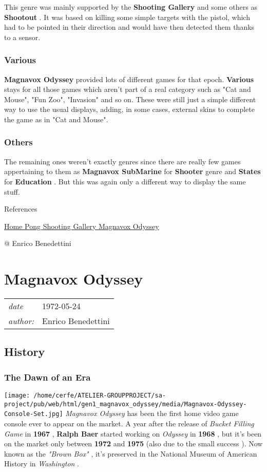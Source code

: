 \documentclass[a4paper,10pt]{book}
\newcommand{\pageHeader}[4]{
    \section{#1}
    \vspace{-0.3cm}
    \begin{table}[h!]
     \begin{tabular}{ll}
        \hline
        \textit{date} & #2 \\
        \textit{author: } & #3\\
        \hline
     \end{tabular}
    \end{table}
    \vspace{-0.3cm}
}
\begin{document}
          This genre was mainly supported by the  
 \textbf{Shooting Gallery }  and some others as  \textbf{Shootout } . It was based on killing some
          simple targets with the pistol, which had to be pointed in their direction and would have then detected
          them thanks to a sensor.
         
 
 \subsubsection{Various }
 
 \textbf{Magnavox Odyssey }  provided lots of different games for that epoch.
           \textbf{Various }  stays for all those games which aren't part of a real category such as
          "Cat and Mouse", "Fun Zoo", "Invasion" and so on. These were still just a simple different way to
          use the usual displays, adding, in some cases, external skins to complete the game as in "Cat and Mouse".
         
 
 \subsubsection{Others }
 
          The remaining ones weren't exactly genres since there are really few games appertaining to them
          as  \textbf{Magnavox SubMarine }  for  \textbf{Shooter }  genre and  \textbf{States }  for
           \textbf{Education } . But this was again only a different way to display the same stuff.
         
 
 
 
 References 
 
 \href{https://www.pngwing.com/en/free-png-ppgqi}{Home Pong }
 \href{https://www.pngwing.com/en/free-png-ppgqi}{Shooting Gallery }
 \href{https://it.wikipedia.org/wiki/Magnavox_Odyssey}{Magnavox Odyssey }
 
 @ Enrico Benedettini 
 
 
 \newpage\pageHeader{Magnavox Odyssey}{1972-05-24}{Enrico Benedettini}{The first home console ever}
 \subsection{History }
 \subsubsection{The Dawn of an Era }
 \texttt{[image: /home/cerfe/ATELIER-GROUPPROJECT/sa-project/pub/web/html/gen1\_magnavox\_odyssey/media/Magnavox-Odyssey-Console-Set.jpg]}
 \textit{Magnavox Odyssey } has been the first home video game console ever to appear on the market.
          A year after the release of  \textit{Bucket Filling Game } in  \textbf{1967 } ,  \textbf{Ralph Baer } 
          started working on  \textit{Odyssey } in  \textbf{1968 } , but it's been on the market only between  \textbf{1972 } 
          and  \textbf{1975 }  (also due to the  small success ).  
          Now known as the  \textit{"Brown Box" },
          it's preserved in the National Museum of American History in  \textit{Washington }.
         
\end{document}
